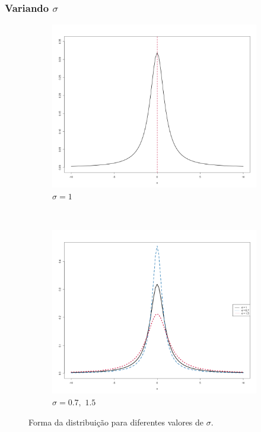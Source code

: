 \documentclass[13pt, aspectratio=169]{beamer}
\begin{document}
\begin{frame}
    \frametitle{Variando $\sigma$}
    
    \begin{figure}[!ht]
        \centering
        \begin{subfigure}[t]{0.4\textwidth}
            \centering
            \includegraphics[width=\textwidth]{images/variando_sigma_1.png}
            \caption{$\sigma = 1$}
        \end{subfigure}%
        ~
        \begin{subfigure}[t]{0.4\textwidth}
            \centering
            \includegraphics[width=\textwidth]{images/variando_sigma_2.png}
            \caption{$\sigma = 0.7, \,\, 1.5$}
        \end{subfigure}%
        \caption{Forma da distribuição para diferentes valores de $\sigma$.}
    \end{figure} 

\end{frame}
\end{document}

